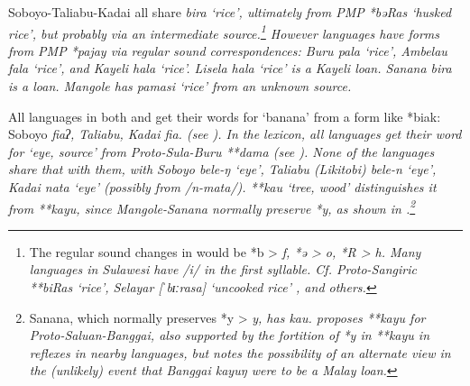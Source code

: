Soboyo-Taliabu-Kadai all share \it{bira} ‘rice’,
ultimately from PMP *bəRas ‘husked rice’,
but probably via an intermediate source.\footnote{
		The regular
		sound changes in 
		would be *b > \it{f},
		*ə > \it{o}, *R > \it{h}.
		Many languages in Sulawesi have /i/ in the first syllable. Cf.
		Proto-Sangiric **biRas ‘rice’, Selayar [ˈbɪːrasa] ‘uncooked rice’
		\citep[106]{GrimesGrimes1987}, and others.}
However  languages have forms from
PMP *pajay via regular sound correspondences: Buru \it{pala}
‘rice’, Ambelau \it{fala} ‘rice’, and  Kayeli \it{hala} ‘rice’.
Lisela \it{hala} ‘rice’ is a Kayeli loan.
Sanana \it{bira} is a  loan.
Mangole has \it{pamasi} ‘rice’ from an unknown source.

All languages in both 
and  get their words for ‘banana’ from a form
like *biak: Soboyo \it{fiaʔ},
Taliabu, Kadai \it{fia}. (see ).
In the lexicon, all  languages get their word
for ‘eye, source’ from Proto-Sula-Buru **dama (see ).
None of the  languages share that with them,
with Soboyo \it{bele-ŋ} ‘eye’,
Taliabu (Likitobi) \it{bele-n} ‘eye’,
Kadai \it{nata} ‘eye’ (possibly from /n-mata/).
 **kau ‘tree, wood’ distinguishes it from 
**kayu, since Mangole-Sanana normally preserve *y,
as shown in .\footnote{
		Sanana, which normally preserves *y > \it{y}, has \it{kau}.
		\citet[77]{Mead2003b} proposes **kayu for Proto-Saluan-Banggai,
		also supported by the fortition of *y in **kayu in reflexes in
		nearby  languages, but notes the
		possibility of an alternate view in the (unlikely)
		event that Banggai \it{kayuŋ} were to be a Malay loan.}



